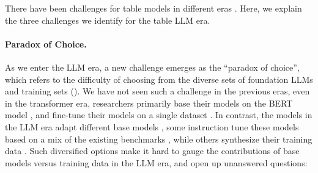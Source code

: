 \documentclass[11pt]{article}
\begin{document}
\begin{table}[t]
    \caption{Information for current table instruction tuned models.
    $\dagger$: a variant based on the Llama 2 model.
    We denote the evaluation datasets with a subscript ``m'' as they are adapted by \citet{zhang2024tablellm}.
    We note that these table LLMs are trained from different base LLMs, and each uses its own instruction tuning data, and is tested on a different set of evaluation benchmarks.
    }
    \label{tab: tablellm-comparison}
\end{table}


There have been challenges for table models in different eras \citep{warren-pereira-1982-efficient, yin-etal-2020-tabert}.
Here, we explain the three challenges we identify for the table LLM era.


\paragraph{Paradox of Choice.}
As we enter the LLM era, a new challenge emerges as the ``paradox of choice'', which refers to the difficulty of choosing from the diverse sets of foundation LLMs and training sets ().
We have not seen such a challenge in the previous eras, even in the transformer era, researchers primarily base their models on the BERT model \citep{yin-etal-2020-tabert, herzig-etal-2020-tapas}, and fine-tune their models on a single dataset \citep{yu-etal-2018-spider, wang-etal-2020-rat}.
In contrast, the models in the LLM era adapt different base models \citep{zhang-etal-2024-tablellama, zhang2024tablellm, wu2025tablebench}, some instruction tune these models based on a mix of the existing benchmarks \citep{zhang-etal-2024-tablellama, deng2025rethinking}, while others synthesize their training data \citep{li2023table}.
Such diversified options make it hard to gauge the contributions of base models versus training data in the LLM era, and open up unanswered questions:
\end{document}
